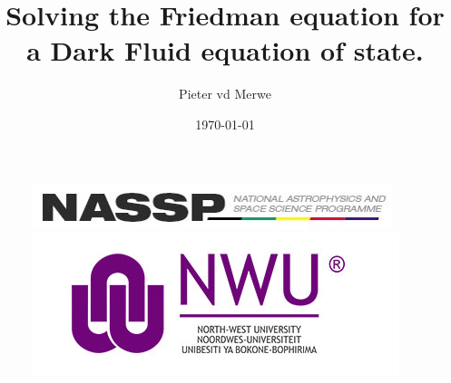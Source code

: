 \documentclass{beamer}
\title{Solving the Friedman equation for a Dark Fluid equation of state.}
\subtitle{}
\author{Pieter vd Merwe}
\institute{North-West University Centre for Space Research}
\date{\today}
\begin{document}
\begin{frame}
\titlepage
\begin{figure}[ht]
    \begin{minipage}{0.45\linewidth}
        \centering
        \includegraphics[width=\textwidth]{./Images/NASSP_logo.jpg}
    \end{minipage}
    \begin{minipage}{0.45\linewidth}
        \centering
        \includegraphics[width=\textwidth]{./Images/nwu_logo.jpg}
    \end{minipage}
\end{figure}
\end{frame}
\end{document}
